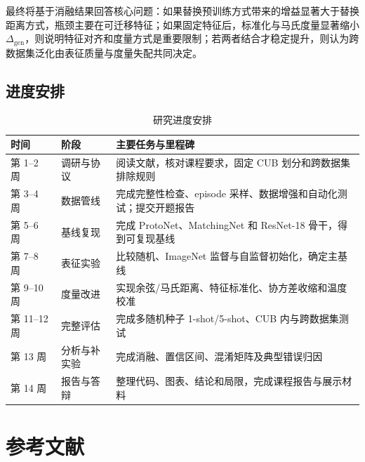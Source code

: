 \documentclass[UTF8,zihao=-4,scheme=chinese]{ctexart}
\begin{document}
最终将基于消融结果回答核心问题：如果替换预训练方式带来的增益显著大于替换距离方式，瓶颈主要在可迁移特征；如果固定特征后，标准化与马氏度量显著缩小 $\Delta_{\mathrm{gen}}$，则说明特征对齐和度量方式是重要限制；若两者结合才稳定提升，则认为跨数据集泛化由表征质量与度量失配共同决定。

\subsection{进度安排}

\begin{table}[htbp]
  \centering
  \caption{研究进度安排}
  \label{tab:schedule}
  \small
  \begin{tabularx}{\textwidth}{p{2.2cm}p{3.0cm}X}
    \toprule
    时间 & 阶段 & 主要任务与里程碑 \\
    \midrule
    第 1--2 周 & 调研与协议 & 阅读文献，核对课程要求，固定 CUB 划分和跨数据集排除规则 \\
    第 3--4 周 & 数据管线 & 完成完整性检查、episode 采样、数据增强和自动化测试；提交开题报告 \\
    第 5--6 周 & 基线复现 & 完成 ProtoNet、MatchingNet 和 ResNet-18 骨干，得到可复现基线 \\
    第 7--8 周 & 表征实验 & 比较随机、ImageNet 监督与自监督初始化，确定主基线 \\
    第 9--10 周 & 度量改进 & 实现余弦/马氏距离、特征标准化、协方差收缩和温度校准 \\
    第 11--12 周 & 完整评估 & 完成多随机种子 1-shot/5-shot、CUB 内与跨数据集测试 \\
    第 13 周 & 分析与补实验 & 完成消融、置信区间、混淆矩阵及典型错误归因 \\
    第 14 周 & 报告与答辩 & 整理代码、图表、结论和局限，完成课程报告与展示材料 \\
    \bottomrule
  \end{tabularx}
\end{table}

\section{参考文献}
\end{document}
